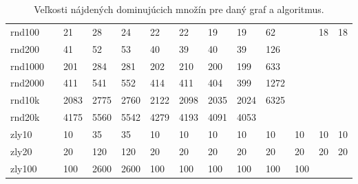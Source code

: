 \begin{landscape}
\begin{table}[h]
\begin{tabular}{lllllllllllll}
		rnd100  &       & 21     & 28      & 24       & 22       & 22       & 19      & 19     & 62         &            & 18     & 18      \\
		rnd200  &       & 41     & 52      & 53       & 40       & 39       & 40      & 39     & 126        &            &        &         \\
		rnd1000 &       & 201    & 284     & 281      & 202      & 210      & 200     & 199    & 633        &            &        &         \\
		rnd2000 &       & 411    & 541     & 552      & 414      & 411      & 404     & 399    & 1272       &            &        &         \\
		rnd10k  &       & 2083   & 2775    & 2760     & 2122     & 2098     & 2035    & 2024   & 6325       &            &        &         \\
		rnd20k  &       & 4175   & 5560    & 5542     & 4279     & 4193     & 4091    & 4053   &            &            &        &         \\
		zly10   &       & 10     & 35      & 35       & 10       & 10       & 10      & 10     & 10         & 10         & 10     & 10      \\
		zly20   &       & 20     & 120     & 120      & 20       & 20       & 20      & 20     & 20         & 20         & 20     & 20      \\
		zly100  &       & 100    & 2600    & 2600     & 100      & 100      & 100     & 100    & 100        & 100        &        &         \\ \hline
	\end{tabular}
	\caption{Veľkosti nájdených dominujúcich množín pre daný graf a algoritmus.}
	\label{table:size}
\end{table}

\end{landscape}

